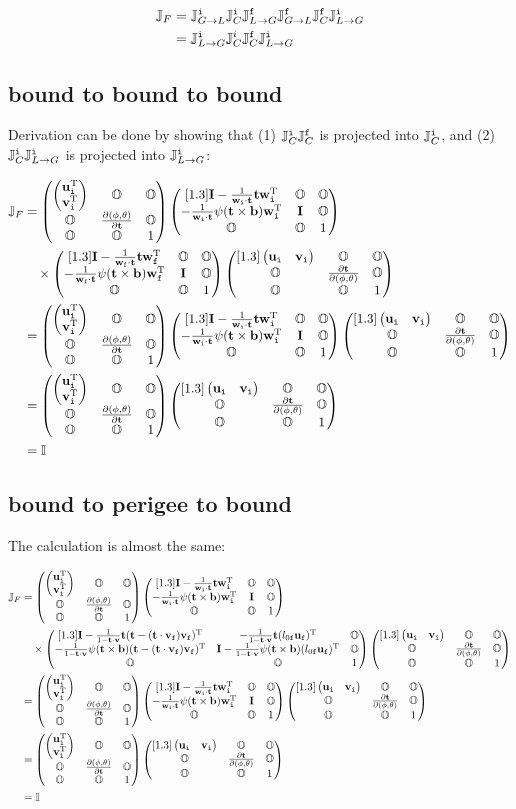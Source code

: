 \documentclass[12pt,a4paper]{scrarticle}
\begin{document}
\begin{align}
    \jacobianFull & = \jacobianGlobalToLocalInitial \jacobianCorrectionInitial \jacobianLocalToGlobalFinal \jacobianGlobalToLocalFinal \jacobianCorrectionFinal \jacobianLocalToGlobalInitial \\
    & = \jacobianLocalToGlobalInitial \jacobianCorrection^i \jacobianCorrectionFinal \jacobianLocalToGlobalInitial
\end{align}

\subsection{bound to bound to bound}

Derivation can be done by showing that (1) $\jacobianCorrectionInitial \jacobianCorrectionFinal$ is projected into $\jacobianCorrectionInitial$, and (2) $\jacobianCorrectionInitial \jacobianLocalToGlobalInitial$ is projected into $\jacobianLocalToGlobalInitial$:

\begin{align*}
    \jacobianFull & = \jacobianGlobalToLocalInitialExpansion \jacobianCorrectionInitialExpansion \\
    & \quad \times \jacobianCorrectionFinalExpansion \jacobianLocalToGlobalInitialExpansion \\
    & = \jacobianGlobalToLocalInitialExpansion \jacobianCorrectionInitialExpansion \jacobianLocalToGlobalInitialExpansion \\
    & = \jacobianGlobalToLocalInitialExpansion \jacobianLocalToGlobalInitialExpansion \\ 
    & = \IdentityMatrixFive
\end{align*}


\subsection{bound to perigee to bound}

The calculation is almost the same:

\begin{align*}
    \jacobianFull & = \jacobianGlobalToLocalInitialExpansion \jacobianCorrectionInitialExpansion \\
    & \quad \times \jacobianCorrectionFinalExpansionPerigee \jacobianLocalToGlobalInitialExpansion \\    
    & = \jacobianGlobalToLocalInitialExpansion \jacobianCorrectionInitialExpansion \jacobianLocalToGlobalInitialExpansion \\
    & = \jacobianGlobalToLocalInitialExpansion \jacobianLocalToGlobalInitialExpansion \\ 
    & = \IdentityMatrixFive
\end{align*}
\end{document}
